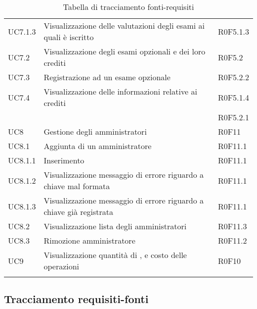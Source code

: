 \documentclass[AnalisiDeiRequisiti.tex]{subfiles}
\begin{document}
\begin{longtable}[H]{p{2cm}p{5cm}p{5cm}}
	UC7.1.3 & Visualizzazione delle valutazioni degli esami ai quali è iscritto	& R0F5.1.3 \\  
	UC7.2 & Visualizzazione degli esami opzionali e dei loro crediti & R0F5.2 \\  
	UC7.3 & Registrazione ad un esame opzionale & R0F5.2.2 \\  
	UC7.4 & Visualizzazione delle informazioni relative ai crediti & R0F5.1.4 \\ 
	& & R0F5.2.1 \\  
	UC8 & Gestione degli amministratori & R0F11 \\  
	UC8.1 & Aggiunta di un amministratore & R0F11.1 \\  
	UC8.1.1 & Inserimento \citGloss{chiave pubblica} & R0F11.1 \\  
	UC8.1.2 & Visualizzazione messaggio di errore riguardo a chiave mal formata & R0F11.1 \\  
	UC8.1.3 & Visualizzazione messaggio di errore riguardo a chiave già registrata & R0F11.1 \\  
	UC8.2 & Visualizzazione lista degli amministratori & R0F11.3 \\  
	UC8.3 & Rimozione amministratore & R0F11.2 \\  
	UC9 & Visualizzazione quantità di \citGloss{Gas}, \citGloss{Ether} e costo delle operazioni & R0F10 \\  
	\hiderowcolors
	\caption{Tabella di tracciamento fonti-requisiti}
\end{longtable}

\subsection{Tracciamento requisiti-fonti}
\end{document}
